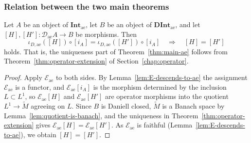 \subsubsection{Relation between the two main theorems}\label{sec:two-chapters}

\begin{corollary}\label{cor:ch3-uniqueness-from-ch4}
  Let $A$ be an object of $\mathbf{Int}_{\mathrm{ae}}$, let $B$ be an object of
  $\mathbf{DInt}_{\mathrm{ae}}$, and let
  $[H],[H']:\mathcal{D}_{\mathrm{ae}}A\to B$ be morphisms.
  Then
  \[
    \iota_{D,\mathrm{ae}}([H])\circ[i_A]
    =\iota_{D,\mathrm{ae}}([H'])\circ[i_A]
    \quad\Longrightarrow\quad
    [H]=[H']
  \]
  holds. That is, the uniqueness part of
  Theorem~\ref{thm:main-ae} follows from
  Theorem~\ref{thm:operator-extension} of
  Section~\ref{chap:operator}.
\end{corollary}
\begin{proof}
  Apply $\mathcal{E}_{\mathrm{ae}}$ to both sides.
  By Lemma~\ref{lem:E-descends-to-ae} the assignment
  $\mathcal{E}_{\mathrm{ae}}$ is a functor, and
  $\mathcal{E}_{\mathrm{ae}}[i_A]$ is the morphism determined by the inclusion
  $L\subset L^1$, so $\mathcal{E}_{\mathrm{ae}}[H]$ and
  $\mathcal{E}_{\mathrm{ae}}[H']$ are operator morphisms into the quotient
  $L^1\to\widetilde{M}$ agreeing on $L$.
  Since $B$ is Daniell closed, $\widetilde{M}$ is a Banach space by
  Lemma~\ref{lem:quotient-is-banach}, and the uniqueness in
  Theorem~\ref{thm:operator-extension} gives
  $\mathcal{E}_{\mathrm{ae}}[H]=\mathcal{E}_{\mathrm{ae}}[H']$.
  As $\mathcal{E}_{\mathrm{ae}}$ is faithful
  (Lemma~\ref{lem:E-descends-to-ae}), we obtain $[H]=[H']$.
\end{proof}

